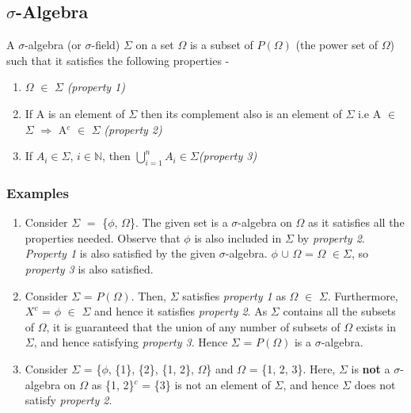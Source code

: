 \documentclass{article}
\begin{document}
\subsection{$\sigma$-Algebra}
A $\sigma$-algebra (or $\sigma$-field) $\Sigma$ on a set $\Omega$ is a subset of $P(\Omega)$ (the power set of $\Omega$) such that it satisfies the following properties -


\begin{enumerate}
	\item $\Omega$ $\in$ $\Sigma$ \textit{(property 1)}
	\item If A is an element of $\Sigma$ then its complement also is an element of $\Sigma$ i.e A $\in$ $\Sigma$ $\Rightarrow$ A$^c$ $\in$ $\Sigma$ \textit{(\textit{property 2})}
	\item If $A_i \in \Sigma$, 
	$i\in \mathbb{N}$, then $\bigcup\limits_{i=1}^{n}A_i \in \Sigma$\textit{(\textit{property 3})}
\end{enumerate}



\subsubsection{Examples}
\begin{enumerate}
	\item Consider $\Sigma$ $=$ \{$\phi$, $\Omega$\}. The given set is a $\sigma$-algebra on $\Omega$ as it satisfies all the properties needed. Observe that $\phi$ is also included in $\Sigma$ by \textit{property 2}. \textit{Property 1} is also satisfied by the given $\sigma$-algebra. $\phi $ $\cup$ $\Omega$ = $\Omega$ $\in \Sigma$, so \textit{property 3} is also satisfied.
	\item Consider $\Sigma$ = $P(\Omega)$. Then, $\Sigma$ satisfies \textit{property 1} as $\Omega$ $\in$ $\Sigma$. Furthermore, $X^c$ = $\phi$ $\in$ $\Sigma$ and hence it satisfies \textit{property 2}. As $\Sigma$ contains all the subsets of $\Omega$, it is guaranteed that the union of any number of subsets of $\Omega$ exists in $\Sigma$, and hence satisfying \textit{property 3}. Hence $\Sigma$ = $P(\Omega)$ is a $\sigma$-algebra. 
	\item Consider $\Sigma$ = \{$\phi$, \{1\}, \{2\}, \{1, 2\}, $\Omega$\} and $\Omega$ = \{1, 2, 3\}. Here, $\Sigma$ is \textbf{not} a $\sigma$-algebra on $\Omega$ as \{1, 2\}$^c$ = \{3\} is not an element of $\Sigma$, and hence $\Sigma$ does not satisfy \textit{property 2}.
\end{enumerate}
\end{document}
